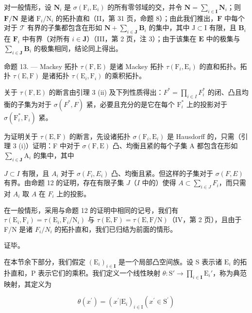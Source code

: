 对一般情形，设 \(\mathbf{N}_i\) 是 \(\sigma (\mathrm{F}_i,\mathrm{E}_i)\) 的所有零邻域的交，并令 \(\mathbf{N} = \sum_{i\in \mathbf{I}}\mathbf{N}_i\)；则 \(\mathbf{F} / \mathbf{N}\) 是诸 \(\mathrm{F}_i / \mathrm{N}_i\) 的拓扑直和（II，第 31 页，命题 8）；由此我们推出，\(\mathbf{F}\) 中每个对于 \(\mathcal{T}\) 有界的子集都包含在形如 \(\mathbf{N} + \sum_{i\in \mathbf{J}}\mathbf{B}_i\) 的集中，其中 \(\mathrm{J}\subset \mathrm{I}\) 有限，且 \(\mathbf{B}_i\) 在 \(\mathbf{F}_i\) 中有界（对所有 \(i\in \mathbf{J}\)）（III，第 2 页，注 3）；由于该集在 \(\mathbf{E}\) 中的极集与 \(\sum_{i\in \mathbf{J}}\mathbf{B}_i\) 的极集相同，结论同上得出。

命题 13. --- Mackey 拓扑 \(\tau(\mathrm{F},\mathrm{E})\) 是诸 Mackey 拓扑 \(\tau(\mathrm{F}_i,\mathrm{E}_i)\) 的直和拓扑。拓扑 \(\tau(\mathrm{E},\mathrm{F})\) 是诸拓扑 \(\tau(\mathrm{E}_i,\mathrm{F}_i)\) 的乘积拓扑。

关于 \(\tau(\mathrm{F},\mathrm{E})\) 的断言由引理 3 (ii) 及下列性质得出：\(F^{*} = \prod_{i\in I}F_{i}^{*}\) 的闭、凸且均衡的子集为对于 \(\sigma(F^{*},F)\) 紧，必要且充分的是它在每个 \(\mathrm{F}_i^*\) 上的投影对于 \(\sigma(\mathrm{F}_i^*, \mathrm{F}_i)\) 紧。

为证明关于 \(\tau(\mathrm{E},\mathrm{F})\) 的断言，先设诸拓扑 \(\sigma(\mathrm{F}_i,\mathrm{E}_i)\) 是 Hausdorff 的，只需（引理 3 (i)）证明：F 中对于 \(\sigma(\mathrm{F},\mathrm{E})\) 凸、均衡且紧的每个子集 A 都包含在形如 \(\sum_{i\in\mathbf{J}}\mathrm{A}_i\) 的集中，其中

\(J \subset I\) 有限，且 \(A_{i}\) 对于 \(\sigma(F_{i}, E_{i})\) 凸、均衡且紧。但这样的子集对于 \(\sigma(F, E)\) 有界。由命题 12 的证明，存在有限子集 \(J\)（\(I\) 中的）使得 \(A \subset \sum_{i \in J} F_i\)，而只需对 \(A_i\) 取 \(A\) 在 \(F_i\) 上的投影。

在一般情形，采用与命题 12 的证明中相同的记号，我们有 \(\tau(\mathrm{E}_{i},\mathrm{F}_{i})=\tau(\mathrm{E}_{i},\mathrm{F}_{i}/\mathrm{N}_{i})\) 与 \(\tau(\mathrm{E},\mathrm{F})=\tau(\mathrm{E},\mathrm{F}/\mathrm{N})\)（IV，第 2 页），且由于 F/N 是诸 \(F_{i}/N_{i}\) 的拓扑直和，我们已归结为前面的情形。

证毕。

在本节余下部分，我们假定 \((\mathrm{E}_i)_{i\in \mathbf{I}}\) 是一个局部凸空间族。设 S 表示诸 \(\mathrm{E}_i\) 的拓扑直和，P 表示它们的乘积。我们定义一个线性映射 \(\theta :\mathrm{S}'\to \prod_{i\in \mathbf{I}}\mathrm{E}_i'\)，称为典范映射，其定义为

\[
\theta (x ^ {\prime}) = (x ^ {\prime} | \mathrm{E} _ {i}) _ {i \in \mathrm{I}} (x ^ {\prime} \in \mathrm{S} ^ {\prime})\tag{10}
\]

